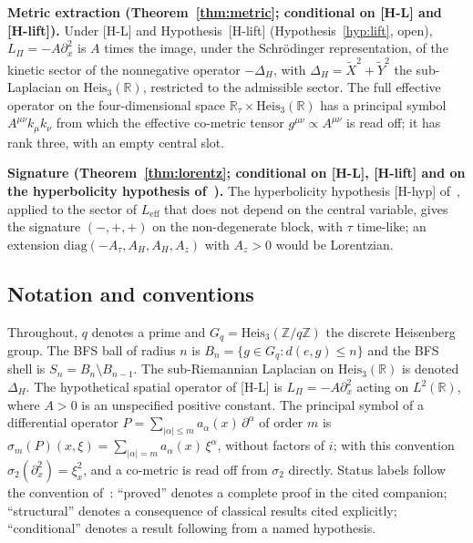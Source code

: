 \documentclass[11pt,a4paper]{article}
\theoremstyle{definition}
\theoremstyle{remark}
\newcommand{\HeisR}{\mathrm{Heis}_3(\mathbb{R})}
\newcommand{\HeisZ}{\mathrm{Heis}_3(\mathbb{Z}/q\mathbb{Z})}
\newcommand{\DeltaH}{\Delta_H}
\newcommand{\LPi}{L_\Pi}
\newcommand{\Gq}{G_q}
\newcommand{\Bn}{B_n}
\newcommand{\Sn}{S_n}
\begin{document}
    \medskip
    \noindent\textbf{Metric extraction (Theorem~\ref{thm:metric}; conditional on [H-L] and [H-lift]).}
    Under [H-L] and Hypothesis~[H-lift] (Hypothesis~\ref{hyp:lift}, open),
    $\LPi = -A\partial_x^2$ is
    $A$ times the image, under the Schr\"{o}dinger representation, of the kinetic sector of the
    nonnegative operator $-\DeltaH$, with $\DeltaH = \tilde X^2 + \tilde Y^2$ the sub-Laplacian on $\HeisR$,
    restricted to the admissible sector.
    The full effective operator on the four-dimensional space $\mathbb{R}_\tau \times \HeisR$
    has a principal symbol $A^{\mu\nu} k_\mu k_\nu$ from which the effective co-metric tensor
    $g^{\mu\nu} \propto A^{\mu\nu}$ is read off; it has rank three, with an empty central slot.

    \medskip
    \noindent\textbf{Signature (Theorem~\ref{thm:lorentz}; conditional on [H-L], [H-lift]
  and on the hyperbolicity hypothesis of~\cite{Beau2026c}).}
    The hyperbolicity hypothesis [H-hyp] of~\cite{Beau2026c}, applied to the sector of $L_{\mathrm{eff}}$ that does
    not depend on the central variable, gives the signature $(-,+,+)$ on the non-degenerate block, with $\tau$
    time-like; an extension $\mathrm{diag}(-A_\tau, A_H, A_H, A_z)$ with $A_z > 0$ would be Lorentzian.

  \subsection{Notation and conventions}

    Throughout, $q$ denotes a prime and $\Gq = \HeisZ$ the discrete Heisenberg group.
    The BFS ball of radius $n$ is $\Bn = \{g \in \Gq : d(e,g) \leq n\}$ and the BFS shell
    is $\Sn = \Bn \setminus B_{n-1}$.
    The sub-Riemannian Laplacian on $\HeisR$ is denoted $\DeltaH$.
    The hypothetical spatial operator of [H-L] is $\LPi = -A\partial_x^2$ acting on
    $L^2(\mathbb{R})$, where $A > 0$ is an unspecified positive constant.
    The principal symbol of a differential operator $P = \sum_{|\alpha| \leq m} a_\alpha(x)\,\partial^\alpha$ of
    order $m$ is $\sigma_m(P)(x,\xi) = \sum_{|\alpha| = m} a_\alpha(x)\,\xi^\alpha$, without factors of $i$; with
    this convention $\sigma_2(\partial_x^2) = \xi_x^2$, and a co-metric is read off from $\sigma_2$ directly.
    Status labels follow the convention of~\cite{Beau2026q5a}: ``proved'' denotes a
    complete proof in the cited companion; ``structural'' denotes a consequence of classical
    results cited explicitly; ``conditional'' denotes a result following from a named
    hypothesis.
\end{document}
